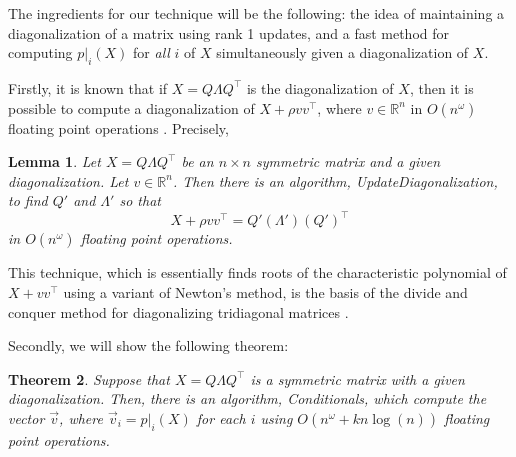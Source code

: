 \documentclass{amsart}
\newtheorem{theorem}{Theorem}[section]
\newtheorem{lemma}[theorem]{Lemma}
\theoremstyle{definition}
\newcommand{\R}{\mathbb{R}}
\begin{document}
The ingredients for our technique will be the following: the idea of maintaining a diagonalization of a matrix using rank 1 updates, and a fast method for computing $p|_i(X)$ for \emph{all} $i$ of $X$ simultaneously given a diagonalization of $X$.

Firstly, it is known that if $X = Q\Lambda Q^{\intercal}$ is the diagonalization of $X$, then it is possible to compute a diagonalization of $X +\rho vv^{\intercal}$, where $v \in\R^n$ in $O(n^{\omega})$ floating point operations \cite{demmel1997applied,TODO}. Precisely,
\begin{lemma}
    Let $X = Q\Lambda Q^{\intercal}$ be an $n\times n$ symmetric matrix and a given diagonalization. Let $v \in \R^n$. Then there is an algorithm, \emph{UpdateDiagonalization}, to find $Q'$ and $\Lambda'$ so that 
    \[
        X + \rho vv^{\intercal} = Q'(\Lambda')(Q')^{\intercal}
    \]
    in $O(n^{\omega})$ floating point operations.
\end{lemma}
This technique, which is essentially finds roots of the characteristic polynomial of $X + vv^{\intercal}$ using a variant of Newton's method, is the basis of the divide and conquer method for diagonalizing tridiagonal matrices \cite{TODO}.

Secondly, we will show the following theorem:
\begin{theorem}
    \label{thm:fast_comp}
    Suppose that $X = Q\Lambda Q^{\intercal}$ is a symmetric matrix with a given diagonalization. Then, there is an algorithm, \emph{Conditionals}, which compute the vector $\vec{v}$, where $\vec{v}_i = p|_{i}(X)$ for each $i$ using $O(n^{\omega} + kn\log(n))$ floating point operations.
\end{theorem}
\end{document}
